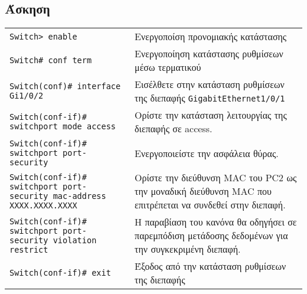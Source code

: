\documentclass[12pt]{article}
\begin{document}
\subsection*{Άσκηση}
\begin{tabular}{m{12cm}m{7cm}}
	\texttt{Switch> enable} &Ενεργοποίση προνομιακής κατάστασης \\[0.25cm]
	\texttt{Switch\# conf term} & Ενεργοποίηση κατάστασης ρυθμίσεων μέσω τερματικού\\[0.25cm]
	\texttt{Switch(conf)\# interface Gi1/0/2} & Εισέλθετε στην κατάσταση ρυθμίσεων της διεπαφής \texttt{GigabitEthernet1/0/1}\\[0.125cm]
	\texttt{Switch(conf-if)\# switchport mode access} & Ορίστε την κατάσταση λειτουργίας της διεπαφής σε access.\\[0.25cm]
	\texttt{Switch(conf-if)\# switchport port-security} & Ενεργοποιείστε την ασφάλεια θύρας.\\[0.25cm]
	\texttt{Switch(conf-if)\# switchport port-security mac-address ΧΧΧΧ.ΧΧΧΧ.ΧΧΧΧ} & Ορίστε την διεύθυνση MAC του PC2 ως την μοναδική διεύθυνση MAC που επιτρέπεται να συνδεθεί στην διεπαφή.\\[0.25cm]
	\texttt{Switch(conf-if)\# switchport port-security violation restrict} & H παραβίαση του κανόνα θα οδηγήσει σε παρεμπόδιση μετάδοσης δεδομένων για την συγκεκριμένη διεπαφή.\\[0.25cm]
	\texttt{Switch(conf-if)\# exit} &Έξοδος από την κατάσταση ρυθμίσεων της διεπαφής
\end{tabular}
\end{document}
